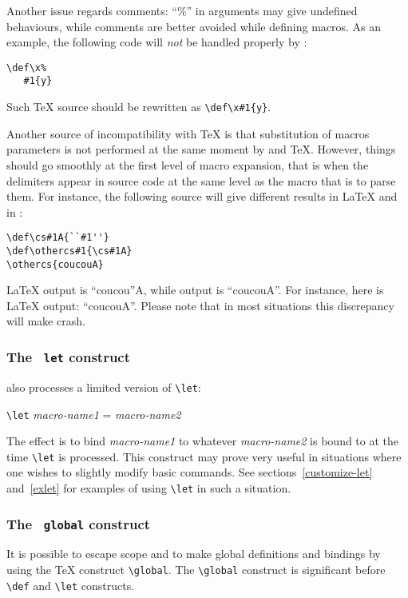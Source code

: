 Another issue regards comments: ``\%'' in arguments may give undefined
behaviours, while comments are better avoided while defining
macros. As an example, the following code will \emph{not}
be handled properly
by \hevea:
\begin{verbatim}
\def\x%
   #1{y}
\end{verbatim}
Such \TeX{} source should be rewritten as \verb+\def\x#1{y}+.


Another source of incompatibility with \TeX{} is that  substitution of
macros parameters is not performed at the same moment by \hevea{} and
\TeX{}.
However, things should go smoothly at the first level of macro
expansion, that is when the delimiters
appear in source code at the same level as the macro that is to
parse them.
For instance, the following source will give different results in
\LaTeX{} and in \hevea:
\begin{verbatim}
\def\cs#1A{``#1''}
\def\othercs#1{\cs#1A}
\othercs{coucouA}
\end{verbatim}
\LaTeX{} output is ``coucou''A, while \hevea{} output is ``coucouA''.
For instance, here is \ifhevea\hevea\else\LaTeX\fi{} output:
{\def\cs#1A{``#1''}
\def\othercs#1{\cs#1A}
\othercs{coucouA}.}
Please note that in most situations this discrepancy will make
\hevea{} crash. 


\subsubsection{The \texttt{ let} construct}
\hevea{} also processes a
limited version of \verb+\let+:
\begin{flushleft}
\verb+\let+ {\it macro-name1} = {\it macro-name2}
\end{flushleft}
The effect is to bind  {\it macro-name1} to whatever {\it macro-name2}
is bound to at the time \verb+\let+ is processed. This construct may
prove very useful in situations where
one wishes to slightly modify basic commands.
See sections~\ref{customize-let} and~\ref{exlet} for examples of using
\verb+\let+ in such a situation.




\subsubsection{The \texttt{ global} construct}
It is possible to escape scope and to make global definitions
and bindings by using the \TeX{} construct \verb+\global+.
The \verb+\global+ construct is significant before
\verb+\def+ and \verb+\let+ constructs.

